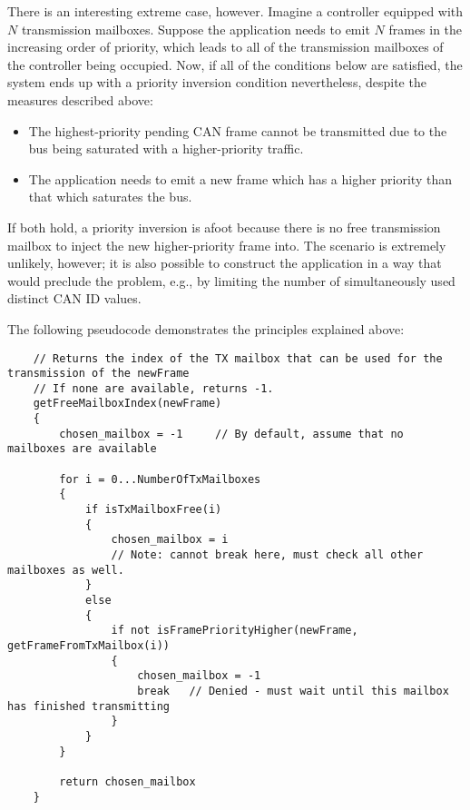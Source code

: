 \begin{remark}[breakable]
    There is an interesting extreme case, however.
    Imagine a controller equipped with $N$ transmission mailboxes.
    Suppose the application needs to emit $N$ frames in the increasing order of priority,
    which leads to all of the transmission mailboxes of the controller being occupied.
    Now, if all of the conditions below are satisfied, the system ends up with a priority inversion condition
    nevertheless, despite the measures described above:

    \begin{itemize}
        \item The highest-priority pending CAN frame cannot be transmitted due to the bus being saturated
        with a higher-priority traffic.
        \item The application needs to emit a new frame which has a higher priority than that which saturates the bus.
    \end{itemize}

    If both hold, a priority inversion is afoot because there is no free transmission mailbox to
    inject the new higher-priority frame into.
    The scenario is extremely unlikely, however;
    it is also possible to construct the application in a way that would preclude the problem,
    e.g., by limiting the number of simultaneously used distinct CAN ID values.

    The following pseudocode demonstrates the principles explained above:

    \begin{samepage}
    \begin{verbatim}
    // Returns the index of the TX mailbox that can be used for the transmission of the newFrame
    // If none are available, returns -1.
    getFreeMailboxIndex(newFrame)
    {
        chosen_mailbox = -1     // By default, assume that no mailboxes are available

        for i = 0...NumberOfTxMailboxes
        {
            if isTxMailboxFree(i)
            {
                chosen_mailbox = i
                // Note: cannot break here, must check all other mailboxes as well.
            }
            else
            {
                if not isFramePriorityHigher(newFrame, getFrameFromTxMailbox(i))
                {
                    chosen_mailbox = -1
                    break   // Denied - must wait until this mailbox has finished transmitting
                }
            }
        }

        return chosen_mailbox
    }
    \end{verbatim}
    \end{samepage}
\end{remark}

